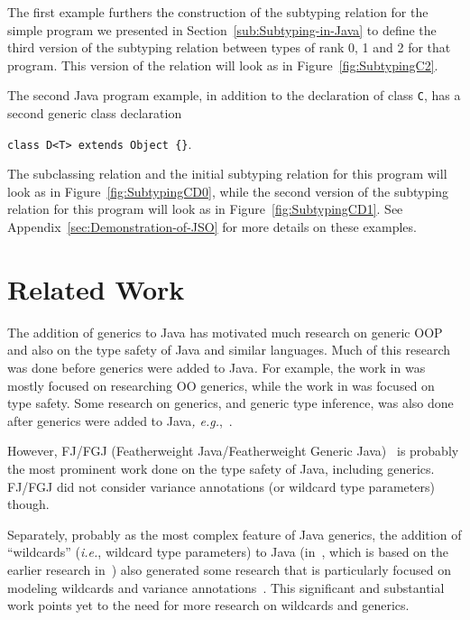 \documentclass[twocolumn,english]{article}
\numberwithin{equation}{section}
\numberwithin{figure}{section}
\newcommand{\code}[1]{\texttt{#1}}
\begin{document}
The first example furthers the construction of the subtyping relation
for the simple program we presented in Section~\ref{sub:Subtyping-in-Java}
to define the third version of the subtyping relation between types
of rank 0, 1 and 2 for that program. This version of the relation
will look as in Figure~\ref{fig:SubtypingC2}.

The second Java program example, in addition to the declaration of
class \code{C}, has a second generic class declaration

\code{class D<T> extends Object \{\}}.

The subclassing relation and the initial subtyping relation for this
program will look as in Figure~\ref{fig:SubtypingCD0}, while the
second version of the subtyping relation for this program will look
as in Figure~\ref{fig:SubtypingCD1}. See Appendix~\ref{sec:Demonstration-of-JSO}
for more details on these examples.


\section{\label{sec:Related-Work}Related Work}

The addition of generics to Java has motivated much research on generic
OOP and also on the type safety of Java and similar languages. Much
of this research was done before generics were added to Java\emph{.
}For example, the work in \cite{Bank96,Agesen97,Bracha98,Corky98,Thorup99}
was mostly focused on researching OO generics, while the work in \cite{Drossopoulou97,flatt98,drossopoulou99,flatt99}
was focused on type safety. Some research on generics, and generic
type inference, was also done after generics were added to Java\emph{,
e.g.},~\cite{SmithJava08,Zhang:2015:LFO:2737924.2738008,AbdelGawad2016c,Grigore2017}.

However, FJ/FGJ (Featherweight Java/Featherweight Generic Java)~\cite{FJ/FGJ}
is probably the most prominent work done on the type safety of Java,
including generics. FJ/FGJ did not consider variance annotations (or
wildcard type parameters) though.

Separately, probably as the most complex feature of Java generics,
the addition of ``wildcards'' (\emph{i.e.}, wildcard type parameters)
to Java (in~\cite{Torgersen2004}, which is based on the earlier
research in~\cite{Igarashi02onvariance-based}) also generated some
research that is particularly focused on modeling wildcards and variance
annotations~\cite{MadsTorgersen2005,Cameron2007,KennedyDecNomVar07,Cameron2008,Summers2010}.
This significant and substantial work points yet to the need for more
research on wildcards and generics.
\end{document}
